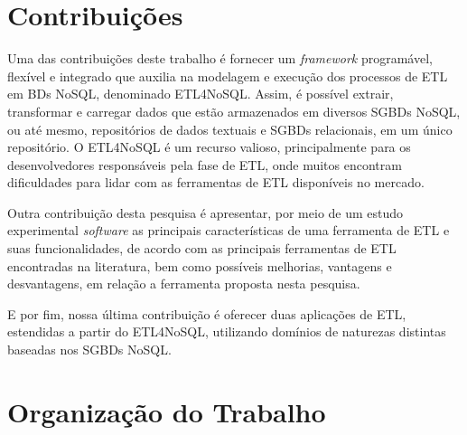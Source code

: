 
\section{Contribuições}

Uma das contribuições deste trabalho é fornecer um \textit{framework} programável, flexível e integrado que auxilia na modelagem e execução dos processos de ETL em BDs NoSQL, denominado ETL4NoSQL. Assim, é possível extrair, transformar e carregar dados que estão armazenados em diversos SGBDs NoSQL, ou até mesmo, repositórios de dados textuais e SGBDs relacionais, em um único repositório. O ETL4NoSQL é um recurso valioso, principalmente para os desenvolvedores responsáveis pela fase de ETL, onde muitos encontram dificuldades para lidar com as ferramentas de ETL disponíveis no mercado. 

Outra contribuição desta pesquisa é apresentar, por meio de um estudo experimental \textit{software} as principais características de uma ferramenta de ETL e suas funcionalidades, de acordo com as principais ferramentas de ETL encontradas na literatura, bem como possíveis melhorias, vantagens e desvantagens, em relação a ferramenta proposta nesta pesquisa.

E por fim, nossa última contribuição é oferecer duas aplicações de ETL, estendidas a partir do ETL4NoSQL, utilizando domínios de naturezas distintas baseadas nos SGBDs NoSQL. 


\section{Organização do Trabalho}

